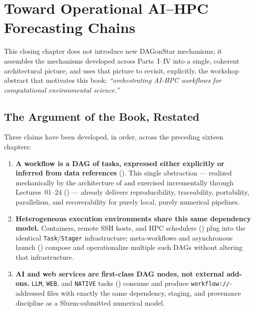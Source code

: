 \chapter{Toward Operational AI--HPC Forecasting Chains}
\label{ch:synthesis}

This closing chapter does not introduce new DAGonStar mechanisms; it
assembles the mechanisms developed across Parts~I--IV into a single,
coherent architectural picture, and uses that picture to revisit, explicitly,
the workshop abstract that motivates this book: \emph{``orchestrating AI-HPC
workflows for computational environmental science.''}

\section{The Argument of the Book, Restated}

Three claims have been developed, in order, across the preceding sixteen
chapters:

\begin{enumerate}[leftmargin=1.8em]
  \item \textbf{A workflow is a DAG of tasks, expressed either explicitly or
    inferred from data references} (). This
    single abstraction --- realized mechanically by the architecture of
     and exercised incrementally through
    Lectures~01--24 ()
    --- already delivers reproducibility, traceability, portability,
    parallelism, and recoverability for purely local, purely numerical
    pipelines.
  \item \textbf{Heterogeneous execution environments share this same
    dependency model.} Containers, remote SSH hosts, and HPC schedulers
    () plug into the identical \texttt{Task}/\texttt{Stager}
    infrastructure; meta-workflows and asynchronous launch
    () compose and operationalize multiple such DAGs
    without altering that infrastructure.
  \item \textbf{AI and web services are first-class DAG nodes, not external
    add-ons.} \texttt{LLM}, \texttt{WEB}, and \texttt{NATIVE} tasks
    () consume and produce
    \texttt{workflow://}-addressed files with exactly the same dependency,
    staging, and provenance discipline as a Slurm-submitted numerical model.
\end{enumerate}


